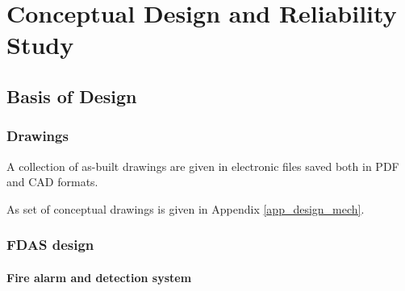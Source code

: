\chapter{Conceptual Design and Reliability Study} %
\label{Chapter6}
%
\section{Basis of Design}
\subsection{Drawings}
A collection of as-built drawings are given in electronic files saved both in PDF and CAD formats.

As set of conceptual drawings is given in Appendix \ref{app_design_mech}.
\subsection{FDAS design}
\subsubsection{Fire alarm and detection system}
